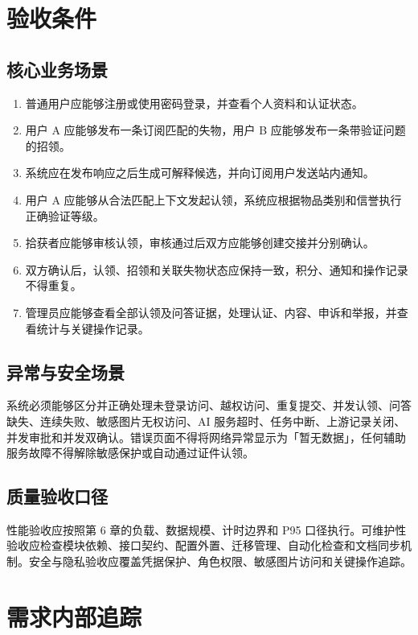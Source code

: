 \section{验收条件}

\subsection{核心业务场景}

\begin{enumerate}
  \item 普通用户应能够注册或使用密码登录，并查看个人资料和认证状态。
  \item 用户 A 应能够发布一条订阅匹配的失物，用户 B 应能够发布一条带验证问题的招领。
  \item 系统应在发布响应之后生成可解释候选，并向订阅用户发送站内通知。
  \item 用户 A 应能够从合法匹配上下文发起认领，系统应根据物品类别和信誉执行正确验证等级。
  \item 拾获者应能够审核认领，审核通过后双方应能够创建交接并分别确认。
  \item 双方确认后，认领、招领和关联失物状态应保持一致，积分、通知和操作记录不得重复。
  \item 管理员应能够查看全部认领及问答证据，处理认证、内容、申诉和举报，并查看统计与关键操作记录。
\end{enumerate}

\subsection{异常与安全场景}

系统必须能够区分并正确处理未登录访问、越权访问、重复提交、并发认领、问答缺失、连续失败、敏感图片无权访问、AI 服务超时、任务中断、上游记录关闭、并发审批和并发双确认。错误页面不得将网络异常显示为「暂无数据」，任何辅助服务故障不得解除敏感保护或自动通过证件认领。

\subsection{质量验收口径}

性能验收应按照第 6 章的负载、数据规模、计时边界和 P95 口径执行。可维护性验收应检查模块依赖、接口契约、配置外置、迁移管理、自动化检查和文档同步机制。安全与隐私验收应覆盖凭据保护、角色权限、敏感图片访问和关键操作追踪。

\section{需求内部追踪}

